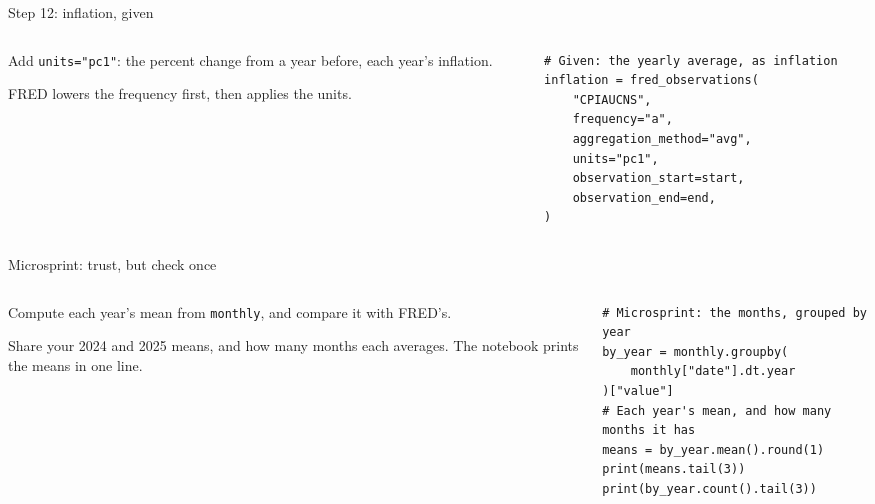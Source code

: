 \documentclass[9pt,aspectratio=169]{beamer}
\begin{document}
\begin{frame}[fragile]{Step 12: inflation, given}
    \begin{columns}[T]
        \begin{column}{0.37\textwidth}
            Add \texttt{units="pc1"}: the percent change from a year before, each year's inflation.

            \medskip
            FRED lowers the frequency first, then applies the units.
        \end{column}
        \begin{column}{0.6\textwidth}
\begin{lstlisting}
# Given: the yearly average, as inflation
inflation = fred_observations(
    "CPIAUCNS",
    frequency="a",
    aggregation_method="avg",
    units="pc1",
    observation_start=start,
    observation_end=end,
)
\end{lstlisting}
        \end{column}
    \end{columns}
\end{frame}

\begin{frame}[fragile]{Microsprint: trust, but check once}
    \begin{columns}[T]
        \begin{column}{0.37\textwidth}
            Compute each year's mean from \texttt{monthly}, and compare it with FRED's.

            \medskip
            Share your 2024 and 2025 means, and how many months each averages. The notebook prints the means in one line.
        \end{column}
        \begin{column}{0.6\textwidth}
\begin{lstlisting}
# Microsprint: the months, grouped by year
by_year = monthly.groupby(
    monthly["date"].dt.year
)["value"]
# Each year's mean, and how many months it has
means = by_year.mean().round(1)
print(means.tail(3))
print(by_year.count().tail(3))
\end{lstlisting}
        \end{column}
    \end{columns}
\end{frame}
\end{document}
